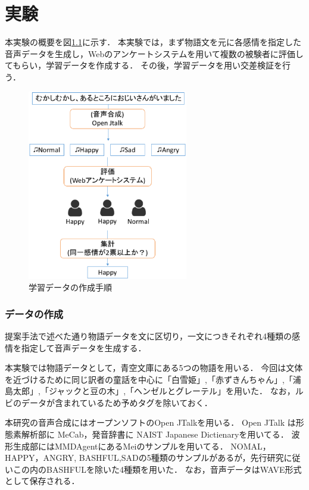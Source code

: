 \chapter{実験}

本実験の概要を図\ref{fig:enquete}に示す．
本実験では，まず物語文を元に各感情を指定した音声データを生成し，Webのアンケートシステムを用いて複数の被験者に評価してもらい，学習データを作成する．
その後，学習データを用い交差検証を行う．

\begin{figure}[h]
  \begin{center}
    \includegraphics[clip,width=7.0cm]{fig/enquete.eps}
    \caption{学習データの作成手順}
    \label{fig:enquete}
  \end{center}
\end{figure}

\subsection{データの作成}
提案手法で述べた通り物語データを文に区切り，一文につきそれぞれ4種類の感情を指定して音声データを生成する．

本実験では物語データとして，青空文庫\cite{aozora}にある5つの物語を用いる．
今回は文体を近づけるために同じ訳者の童話を中心に「白雪姫」,「赤ずきんちゃん」,「浦島太郎」,「ジャックと豆の木」,「ヘンゼルとグレーテル」を用いた．
なお，ルビのデータが含まれているため予めタグを除いておく．

本研究の音声合成にはオープンソフトのOpen JTalk\cite{jtalk}を用いる．
Open JTalk は形態素解析部に MeCab\cite{mecab}，発音辞書に NAIST Japanese Dictienary\cite{naist}を用いてる．
波形生成部にはMMDAgent\cite{mei}にあるMeiのサンプルを用いてる．
NOMAL，HAPPY，ANGRY, BASHFUL,SADの5種類のサンプルがあるが，先行研究に従いこの内のBASHFULを除いた4種類を用いた．
なお，音声データはWAVE形式として保存される．

